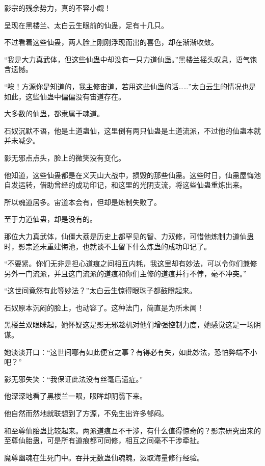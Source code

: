 
\begin{this_body}

影宗的残余势力，真的不容小觑！

呈现在黑楼兰、太白云生眼前的仙蛊，足有十几只。

不过看着这些仙蛊，两人脸上刚刚浮现而出的喜色，却在渐渐收敛。

“我是大力真武体，但这些仙蛊中却没有一只力道仙蛊。”黑楼兰摇头叹息，语气饱含遗憾。

“唉！方源你是知道的，我主修宙道，若用这些仙蛊的话……”太白云生的情况也是如此，这些仙蛊中偏偏没有宙道存在。

大多数的仙蛊，都隶属于魂道。

石奴沉默不语，他是土道蛊仙，这里倒有两只仙蛊是土道流派，不过他的仙蛊本就并未减少。

影无邪点点头，脸上的微笑没有变化。

他知道，这些仙蛊都是在义天山大战中，损毁的那些仙蛊。这些时日，仙蛊屋悔池自发运转，借助曾经的成功印记，和这里的光阴支流，将这些仙蛊重炼出来。

所以魂道居多。宙道本会有，但却是炼制失败了。

至于力道仙蛊，却是没有的。

那位大力真武体，仙僵大荔是历史上都罕见的智、力双修，可惜他炼制力道仙蛊时，影宗还未重建悔池，也就谈不上留下什么炼蛊的成功印记了。

“不要紧。你们无非是担心道痕之间相互内耗，我这里却有妙法，可以令你们兼修另外一门流派，并且这门流派的道痕和你们主修的道痕并行不悖，毫不冲突。”

“这世间竟然有此等妙法？”太白云生惊得眼珠子都鼓瞪起来。

石奴原本沉闷的脸上，也动容了。这种法门，简直是为所未闻！

黑楼兰双眼眯起，她怀疑这是影无邪趁机对他们增强控制力度，她感觉这是一场阴谋。

她淡淡开口：“这世间哪有如此便宜之事？有得必有失，如此妙法，恐怕弊端不小吧？”

影无邪失笑：“我保证此法没有丝毫后遗症。”

他深深地看了黑楼兰一眼，眼眸却阴翳下来。

他自然而然地就联想到了方源，不免生出许多郁闷。

和至尊仙胎蛊比较起来。两派道痕互不干涉，有什么值得惊奇的？影宗研究出来的至尊仙胎蛊，可是所有道痕都可同修，相互之间毫不干涉牵扯。

魔尊幽魂在生死门中。吞并无数蛊仙魂魄，汲取海量修行经验。


\end{this_body}
